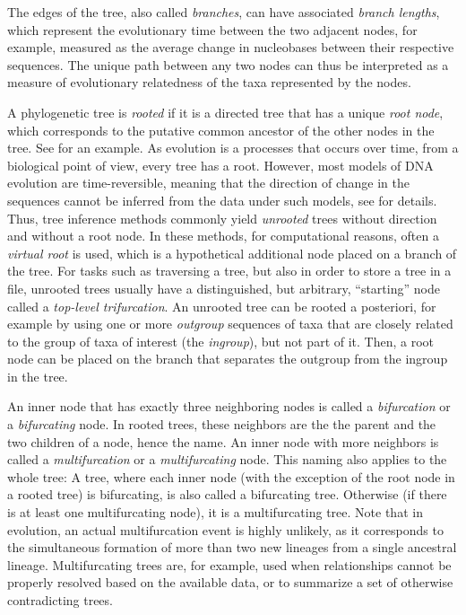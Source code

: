 The edges of the tree, also called \emph{branches}, can have associated \emph{branch lengths},
which represent the evolutionary time between the two adjacent nodes,
for example, measured as the average change in nucleobases between their respective sequences.
The unique path between any two nodes can thus be interpreted
as a measure of evolutionary relatedness of the taxa represented by the nodes.

A phylogenetic tree is \emph{rooted}
if it is a directed tree that has a unique \emph{root node},
which corresponds to the putative common ancestor of the other nodes in the tree.
See  for an example.
As evolution is a processes that occurs over time,
from a biological point of view, every tree has a root.
However, most models of DNA evolution are time-reversible,
meaning that the direction of change in the sequences cannot be inferred from the data under such models,
see  for details.
Thus, tree inference methods commonly yield \emph{unrooted} trees without direction and without a root node.
In these methods, for computational reasons, often a \emph{virtual root} is used,
which is a hypothetical additional node placed on a branch of the tree.
For tasks such as traversing a tree, but also in order to store a tree in a file,
unrooted trees usually have a distinguished, but arbitrary, ``starting'' node called a \emph{top-level trifurcation}.
An unrooted tree can be rooted a posteriori, for example by using one or more \emph{outgroup} sequences of taxa
that are closely related to the group of taxa of interest (the \emph{ingroup}), but not part of it.
Then, a root node can be placed on the branch that separates the outgroup from the ingroup in the tree.

An inner node that has exactly three neighboring nodes is called a \emph{bifurcation} or a \emph{bifurcating} node.
In rooted trees, these neighbors are the the parent and the two children of a node, hence the name.
An inner node with more neighbors is called a \emph{multifurcation} or a \emph{multifurcating} node.
This naming also applies to the whole tree:
A tree, where each inner node (with the exception of the root node in a rooted tree) is bifurcating,
is also called a bifurcating tree.
Otherwise (if there is at least one multifurcating node), it is a multifurcating tree.
Note that in evolution, an actual multifurcation event is highly unlikely,
as it corresponds to the simultaneous formation of more than two new lineages from a single ancestral lineage.
Multifurcating trees are, for example, used when relationships cannot be properly resolved based on the available data,
or to summarize a set of otherwise contradicting trees.


